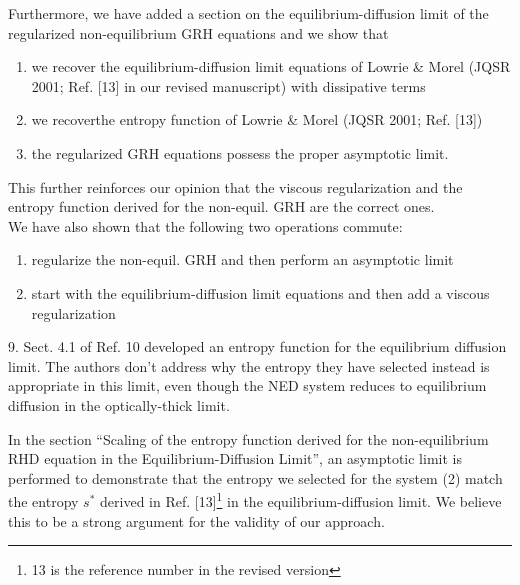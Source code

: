 \documentclass{article}
\begin{document}
Furthermore, we have added a section on the equilibrium-diffusion limit of the regularized non-equilibrium GRH equations and we show that  
\begin{enumerate}
\item we recover the equilibrium-diffusion limit equations of Lowrie \& Morel (JQSR 2001; Ref. [13] in our revised manuscript) with dissipative terms
\item we recoverthe entropy function of Lowrie \& Morel (JQSR 2001; Ref. [13])
\item the regularized GRH equations possess the proper asymptotic limit.
\end{enumerate}
This further reinforces our opinion that the viscous regularization and the entropy function derived for the non-equil. GRH are the correct ones.\\

We have also shown that the following two operations commute:
\begin{enumerate}
\item regularize the non-equil. GRH and then perform an asymptotic limit
\item start with the equilibrium-diffusion limit equations and then add a viscous regularization
\end{enumerate}
 
\bigskip


{
\color{blue}
9. Sect. 4.1 of Ref. 10 developed an entropy function for the equilibrium diffusion limit. The authors don't address why the entropy they have selected instead is appropriate in this limit, even though the NED system reduces to equilibrium diffusion in the optically-thick limit.
}

In the section ``Scaling of the entropy function derived for the non-equilibrium RHD equation in the Equilibrium-Diffusion Limit'', an asymptotic limit is performed to demonstrate that the entropy we selected for the system (2) match the entropy $s^*$ derived in Ref. [13]\footnote{13 is the reference number in the revised version} in the equilibrium-diffusion limit. We believe this to be a strong argument for the validity of our approach.
\bigskip
\end{document}
